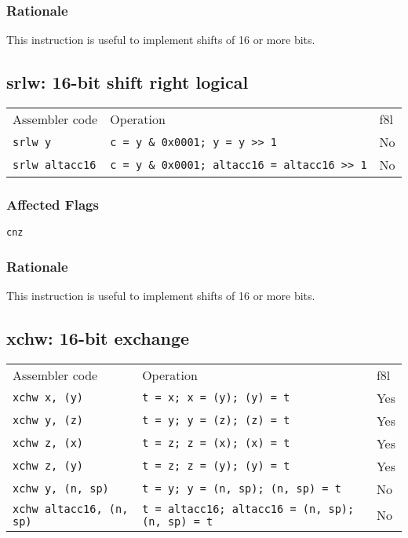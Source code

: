 \documentclass{book}
\begin{document}
\subsubsection*{Rationale}

This instruction is useful to implement shifts of 16 or more bits.


\subsection{srlw: 16-bit shift right logical}

\begin{tabular}{l l l}
Assembler code         & Operation                                          & f8l \\
\texttt{srlw y}        & \texttt{c = y \& 0x0001; y = y >> 1}               & No \\
\texttt{srlw altacc16} & \texttt{c = y \& 0x0001; altacc16 = altacc16 >> 1} & No \\
\end{tabular}

\subsubsection*{Affected Flags}

\texttt{cnz}

\subsubsection*{Rationale}

This instruction is useful to implement shifts of 16 or more bits.


\subsection{xchw: 16-bit exchange}

\begin{tabular}{l l l}
Assembler code                  & Operation                                              & f8l \\
\texttt{xchw x, (y)}            & \texttt{t = x; x = (y); (y) = t}                       & Yes \\
\texttt{xchw y, (z)}            & \texttt{t = y; y = (z); (z) = t}                       & Yes \\
\texttt{xchw z, (x)}            & \texttt{t = z; z = (x); (x) = t}                       & Yes \\
\texttt{xchw z, (y)}            & \texttt{t = z; z = (y); (y) = t}                       & Yes \\
\texttt{xchw y, (n, sp)}        & \texttt{t = y; y = (n, sp); (n, sp) = t}               & No \\
\texttt{xchw altacc16, (n, sp)} & \texttt{t = altacc16; altacc16 = (n, sp); (n, sp) = t} & No \\
\end{tabular}
\end{document}
